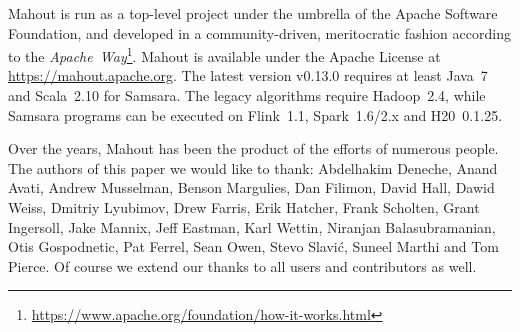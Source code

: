 \documentclass[twoside,11pt]{article}
\begin{document}
Mahout is run as a top-level project under the umbrella of the Apache Software Foundation, and developed in a community-driven, meritocratic fashion according to the \textit{Apache~Way}\footnote{\url{https://www.apache.org/foundation/how-it-works.html}}. Mahout is available under the Apache License at \url{https://mahout.apache.org}. The latest version v0.13.0 requires at least Java~7 and Scala~2.10 for Samsara. The legacy algorithms require Hadoop~2.4, while Samsara programs can be executed on Flink~1.1, Spark~1.6/2.x and H20~0.1.25.

\acks{}
Over the years, Mahout has been the product of the efforts of numerous people. The authors of this paper we would like to thank: Abdelhakim Deneche, Anand Avati, Andrew Musselman, Benson Margulies, Dan Filimon, David Hall, Dawid Weiss, Dmitriy Lyubimov, Drew Farris, Erik Hatcher, Frank Scholten, Grant Ingersoll, Jake Mannix, Jeff Eastman, Karl Wettin, Niranjan Balasubramanian, Otis Gospodnetic, Pat Ferrel, Sean Owen, Stevo Slavić, Suneel Marthi and Tom Pierce. Of course we extend our thanks to all users and contributors as well.


\end{document}
